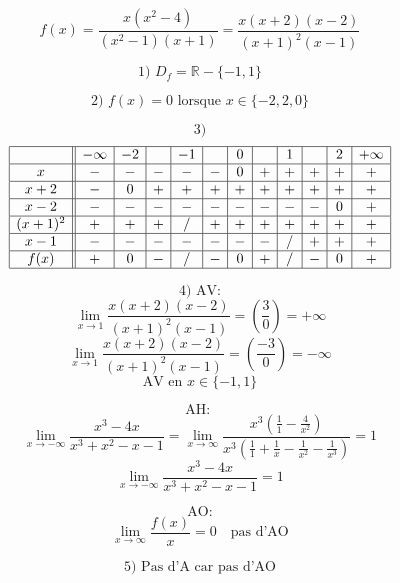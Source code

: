 \documentclass{article}
\begin{document}
\[ f(x) = \frac{x(x^2-4)}{(x^2-1)(x+1)} = \frac{x(x+2)(x-2)}{(x+1)^2(x-1)} \]

\[ \text{1) } D_f = \mathbb{R} - \{-1, 1\} \]

\[ \text{2) } f(x) = 0 \text{ lorsque } x \in \{-2, 2, 0\} \]

\[ \text{3)} \]
\[
\begin{array}{|c||c|c|c|c|c|c|c|c|c|c|c|c|c|}
\hline
 & -\infty & -2 & & -1 & & 0 & & 1 & & 2 & +\infty \\
\hline
x & - & - & - & - & - & 0 & + & + & + & + & + \\
\hline
x+2 & - & 0 & + & + & + & + & + & + & + & + & + \\
\hline
x-2 & - & - & - & - & - & - & - & - & - & 0 & + \\
\hline
(x+1)^2 & + & + & + & / & + & + & + & + & + & + & + \\
\hline
x-1 & - & - & - & - & - & - & - & / & + & + & + \\
\hline
f(x) & + & 0 & - & / & - & 0 & + & / & - & 0 & + \\ 
\hline
\end{array}
\]

\[ \text{4) AV:} \]
\[ \lim_{x \to 1} \frac{x(x+2)(x-2)}{(x+1)^2(x-1)} = \left(\frac{3}{0}\right) = +\infty \]
\[ \lim_{x \to 1} \frac{x(x+2)(x-2)}{(x+1)^2(x-1)} = \left(\frac{-3}{0}\right) = -\infty \]
\[ \text{AV en } x \in \{-1, 1\} \]

\[ \text{AH: } \]
\[ \lim_{x \to -\infty} \frac{x^3 - 4x}{x^3 + x^2 - x - 1} = \lim_{x \to \infty} \frac{x^3(\frac{1}{1} - \frac{4}{x^2})}{x^3(\frac{1}{1} + \frac{1}{x} - \frac{1}{x^2} - \frac{1}{x^3})} = 1 \]
\[ \lim_{x \to -\infty} \frac{x^3 - 4x}{x^3 + x^2 - x - 1} = 1 \]

\[ \text{AO:} \]
\[ \lim_{x \to \infty} \frac{f(x)}{x} = 0 \quad \text{pas d'AO} \]

\[ \text{5) Pas d'A car pas d'AO} \]
\end{document}
